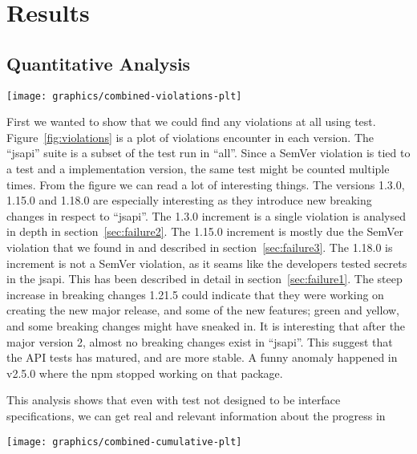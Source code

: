 \section{Results}

\subsection{Quantitative Analysis}

\begin{figure*}
\centering
\texttt{[image: graphics/combined-violations-plt]}
\caption{Violations per version. ``jsapi'' is a subset of violations found in ``all''}
\label{fig:violations}
\end{figure*}

First we wanted to show that we could find any violations at all using
test. Figure~\ref{fig:violations} is a plot of violations encounter in
each version. The ``jsapi'' suite is a subset of the test run in ``all''.
Since a SemVer violation is tied to a test and a implementation version, 
the same test might be counted multiple times. From the figure we can
read a lot of interesting things. The versions 1.3.0, 1.15.0 and 1.18.0 are
especially interesting as they introduce new breaking changes in respect to
``jsapi''.  The 1.3.0 increment is a single violation is analysed in depth in
section~\ref{sec:failure2}. The 1.15.0 increment is mostly due the SemVer
violation that we found in and described in section~\ref{sec:failure3}. The
1.18.0 is increment is not a SemVer violation, as it seams like the developers
tested secrets in the jsapi. This has been described in detail in
section~\ref{sec:failure1}. The steep increase in breaking changes 1.21.5 could
indicate that they were working on creating the new major release, and some of
the new features; green and yellow, and some breaking changes might have
sneaked in. It is interesting that after the major version 2, almost no breaking
changes exist in ``jsapi''. This suggest that the API tests has matured, and
are more stable. A funny anomaly happened in v2.5.0 where the npm stopped
working on that package.

This analysis shows that even with test not designed to be interface
specifications, we can get real and relevant information about the progress in



\begin{figure*}
\centering
\texttt{[image: graphics/combined-cumulative-plt]}
\caption{Violations per version}
\end{figure*}


